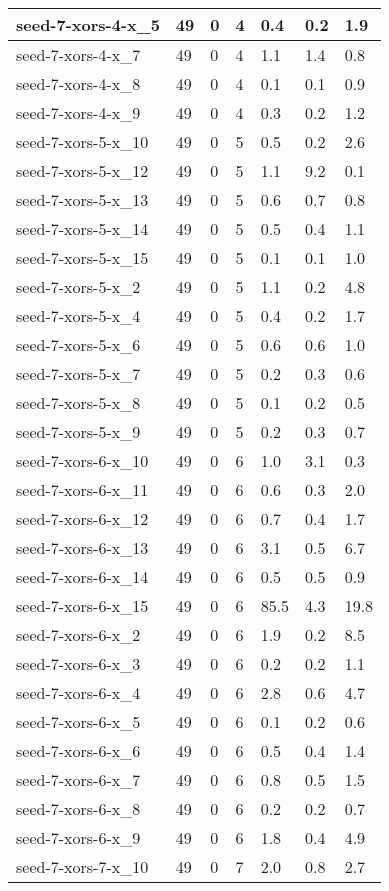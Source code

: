 \begin{scriptsize}
\begin{longtable}{|p{5cm}|l|l|l|l|l|l|}
seed-7-xors-4-x\_5&49&0&4&0.4&0.2&1.9 \\ \hline 
seed-7-xors-4-x\_7&49&0&4&1.1&1.4&0.8 \\ \hline 
seed-7-xors-4-x\_8&49&0&4&0.1&0.1&0.9 \\ \hline 
seed-7-xors-4-x\_9&49&0&4&0.3&0.2&1.2 \\ \hline 
seed-7-xors-5-x\_10&49&0&5&0.5&0.2&2.6 \\ \hline 
seed-7-xors-5-x\_12&49&0&5&1.1&9.2&0.1 \\ \hline 
seed-7-xors-5-x\_13&49&0&5&0.6&0.7&0.8 \\ \hline 
seed-7-xors-5-x\_14&49&0&5&0.5&0.4&1.1 \\ \hline 
seed-7-xors-5-x\_15&49&0&5&0.1&0.1&1.0 \\ \hline 
seed-7-xors-5-x\_2&49&0&5&1.1&0.2&4.8 \\ \hline 
seed-7-xors-5-x\_4&49&0&5&0.4&0.2&1.7 \\ \hline 
seed-7-xors-5-x\_6&49&0&5&0.6&0.6&1.0 \\ \hline 
seed-7-xors-5-x\_7&49&0&5&0.2&0.3&0.6 \\ \hline 
seed-7-xors-5-x\_8&49&0&5&0.1&0.2&0.5 \\ \hline 
seed-7-xors-5-x\_9&49&0&5&0.2&0.3&0.7 \\ \hline 
seed-7-xors-6-x\_10&49&0&6&1.0&3.1&0.3 \\ \hline 
seed-7-xors-6-x\_11&49&0&6&0.6&0.3&2.0 \\ \hline 
seed-7-xors-6-x\_12&49&0&6&0.7&0.4&1.7 \\ \hline 
seed-7-xors-6-x\_13&49&0&6&3.1&0.5&6.7 \\ \hline 
seed-7-xors-6-x\_14&49&0&6&0.5&0.5&0.9 \\ \hline 
seed-7-xors-6-x\_15&49&0&6&85.5&4.3&19.8 \\ \hline 
seed-7-xors-6-x\_2&49&0&6&1.9&0.2&8.5 \\ \hline 
seed-7-xors-6-x\_3&49&0&6&0.2&0.2&1.1 \\ \hline 
seed-7-xors-6-x\_4&49&0&6&2.8&0.6&4.7 \\ \hline 
seed-7-xors-6-x\_5&49&0&6&0.1&0.2&0.6 \\ \hline 
seed-7-xors-6-x\_6&49&0&6&0.5&0.4&1.4 \\ \hline 
seed-7-xors-6-x\_7&49&0&6&0.8&0.5&1.5 \\ \hline 
seed-7-xors-6-x\_8&49&0&6&0.2&0.2&0.7 \\ \hline 
seed-7-xors-6-x\_9&49&0&6&1.8&0.4&4.9 \\ \hline 
seed-7-xors-7-x\_10&49&0&7&2.0&0.8&2.7 \\ \hline 

\end{longtable}
\end{scriptsize}
